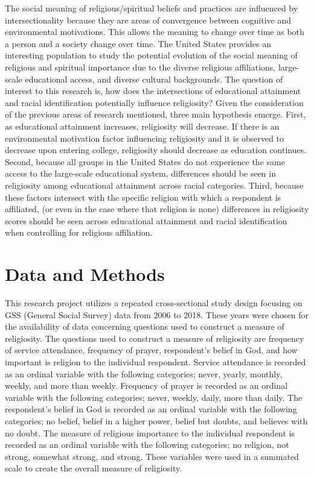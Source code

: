 \documentclass[
  12pt,
  letterpaper,
]{article}
\begin{document}
The social meaning of religious/spiritual beliefs and practices are
influenced by intersectionality because they are areas of convergence
between cognitive and environmental motivations. This allows the meaning
to change over time as both a person and a society change over time. The
United States provides an interesting population to study the potential
evolution of the social meaning of religious and spiritual importance
due to the diverse religious affiliations, large-scale educational
access, and diverse cultural backgrounds. The question of interest to
this research is, how does the intersections of educational attainment
and racial identification potentially influence religiosity? Given the
consideration of the previous areas of research mentioned, three main
hypothesis emerge. First, as educational attainment increases,
religiosity will decrease. If there is an environmental motivation
factor influencing religiosity and it is observed to decrease upon
entering college, religiosity should decrease as education continues.
Second, because all groups in the United States do not experience the
same access to the large-scale educational system, differences should be
seen in religiosity among educational attainment across racial
categories. Third, because these factors intersect with the specific
religion with which a respondent is affiliated, (or even in the case
where that religion is none) differences in religiosity scores should be
seen across educational attainment and racial identification when
controlling for religious affiliation.

\hypertarget{data-and-methods}{%
\section{Data and Methods}\label{data-and-methods}}

This research project utilizes a repeated cross-sectional study design
focusing on GSS (General Social Survey) data from 2006 to 2018. These
years were chosen for the availability of data concerning questions used
to construct a measure of religiosity. The questions used to construct a
measure of religiosity are frequency of service attendance, frequency of
prayer, respondent's belief in God, and how important is religion to the
individual respondent. Service attendance is recorded as an ordinal
variable with the following categories; never, yearly, monthly, weekly,
and more than weekly. Frequency of prayer is recorded as an ordinal
variable with the following categories; never, weekly, daily, more than
daily. The respondent's belief in God is recorded as an ordinal variable
with the following categories; no belief, belief in a higher power,
belief but doubts, and believes with no doubt. The measure of religious
importance to the individual respondent is recorded as an ordinal
variable with the following categories; no religion, not strong,
somewhat strong, and strong. These variables were used in a summated
scale to create the overall measure of religiosity.
\end{document}
